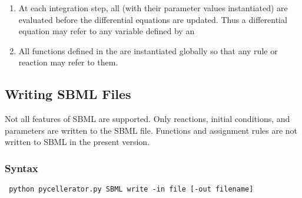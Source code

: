 \begin{enumerate}
\begin{lstlisting}
A + 3B -> 2A + B + C
\end{lstlisting}
with a kinetic law , 
the following {\tt pycellerator} reactions will be generated:
\begin{lstlisting}
 [Nil -> A, using["K/VA"]]
 [B -> Nil, using["2*K/VB"]]
 [Nil -> C, using["K/VC"]]
\end{lstlisting}
where , , and  are the volumes of the compartments that species ,  and  reside in, respectively. All of the stoichiometries inside the  expression are expressed as positive quantities because the sign will be calculated automatically by the interpreter module, because the reaction {\tt [X -> Nil, using["K"]]} will produce the same ODE term as , namely, ${\tt[X]}'=-{\tt K}$.

\item At each integration step, all  (with their parameter values instantiated) are evaluated before the differential equations are updated.  Thus a differential equation may refer to any variable defined by an 
\item All functions defined in the  are instantiated globally so that any rule or reaction may refer to them. 


\end{enumerate}




\subsection{Writing SBML Files}

Not all features of SBML are supported. Only reactions, initial conditions, and parameters are written to the SBML file. Functions and assignment rules are not written to SBML in the present version.

\subsubsection{Syntax}

\begin{lstlisting}
 python pycellerator.py SBML write -in file [-out filename]
\end{lstlisting}

